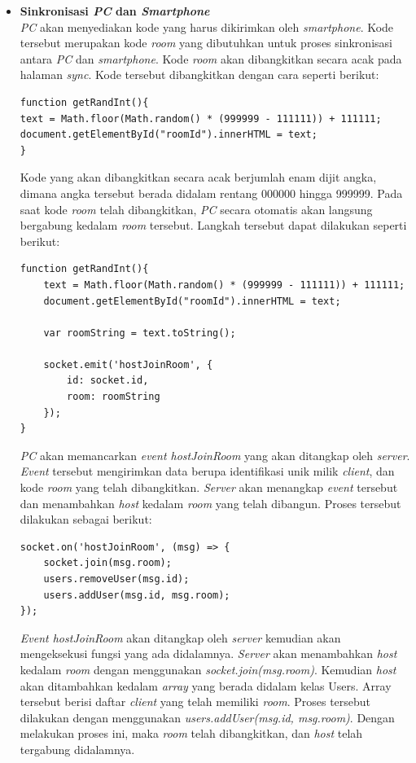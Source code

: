 \begin{enumerate}
\begin{itemize}
		\item \textbf{Sinkronisasi \textit{PC} dan \textit{Smartphone}} \\
		\textit{PC} akan menyediakan kode yang harus dikirimkan oleh \textit{smartphone}. Kode tersebut merupakan kode \textit{room} yang dibutuhkan untuk proses sinkronisasi antara \textit{PC} dan \textit{smartphone}. Kode \textit{room} akan dibangkitkan secara acak pada halaman \textit{sync}. Kode tersebut dibangkitkan dengan cara seperti berikut:
\begin{lstlisting}[caption={proses membangkitkan kode \textit{room}}, label={lst:bangkit_kode}, captionpos=b]
function getRandInt(){
text = Math.floor(Math.random() * (999999 - 111111)) + 111111;
document.getElementById("roomId").innerHTML = text;
}
\end{lstlisting}
		Kode yang akan dibangkitkan secara acak berjumlah enam dijit angka, dimana angka tersebut berada didalam rentang 000000 hingga 999999. Pada saat kode \textit{room} telah dibangkitkan, \textit{PC} secara otomatis akan langsung bergabung kedalam \textit{room} tersebut. Langkah tersebut dapat dilakukan seperti berikut:
\begin{lstlisting}[caption={proses \textit{host} bergabung kedalam room}, label={host_gabung}, captionpos=b]
function getRandInt(){
	text = Math.floor(Math.random() * (999999 - 111111)) + 111111;
	document.getElementById("roomId").innerHTML = text;

	var roomString = text.toString();

	socket.emit('hostJoinRoom', {
		id: socket.id,
		room: roomString
	});
}
\end{lstlisting}
		\textit{PC} akan memancarkan \textit{event hostJoinRoom} yang akan ditangkap oleh \textit{server}. \textit{Event} tersebut mengirimkan data berupa identifikasi unik milik \textit{client}, dan kode \textit{room} yang telah dibangkitkan. \textit{Server} akan menangkap \textit{event} tersebut dan menambahkan \textit{host} kedalam \textit{room} yang telah dibangun. Proses tersebut dilakukan sebagai berikut:
\begin{lstlisting}[caption={server menerima \textit{event} dari \textit{host}}, label={lst:server_acc_host}, captionpos=b]
socket.on('hostJoinRoom', (msg) => {
	socket.join(msg.room);
	users.removeUser(msg.id);
	users.addUser(msg.id, msg.room);
});
\end{lstlisting}
		\textit{Event hostJoinRoom} akan ditangkap oleh \textit{server} kemudian akan mengeksekusi fungsi yang ada didalamnya. \textit{Server} akan menambahkan \textit{host} kedalam \textit{room} dengan menggunakan \textit{socket.join(msg.room)}. Kemudian \textit{host} akan ditambahkan kedalam \textit{array} yang berada didalam kelas Users. Array tersebut berisi daftar \textit{client} yang telah memiliki \textit{room}. Proses tersebut dilakukan dengan menggunakan \textit{users.addUser(msg.id, msg.room)}. Dengan melakukan proses ini, maka \textit{room} telah dibangkitkan, dan \textit{host} telah tergabung didalamnya.
		

\end{itemize}
\end{enumerate}
